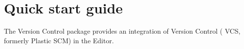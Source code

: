 \chapter{Quick start guide}
\hypertarget{md__library_2_package_cache_2com_8unity_8collab-proxy_0d2_83_81_2_documentation_0i_2_quick_start_guide}{}\label{md__library_2_package_cache_2com_8unity_8collab-proxy_0d2_83_81_2_documentation_0i_2_quick_start_guide}
\label{md__library_2_package_cache_2com_8unity_8collab-proxy_0d2_83_81_2_documentation_0i_2_quick_start_guide_autotoc_md155}%
%
 The Version Control package provides an integration of  Version Control ( VCS, formerly Plastic SCM) in the  Editor.

